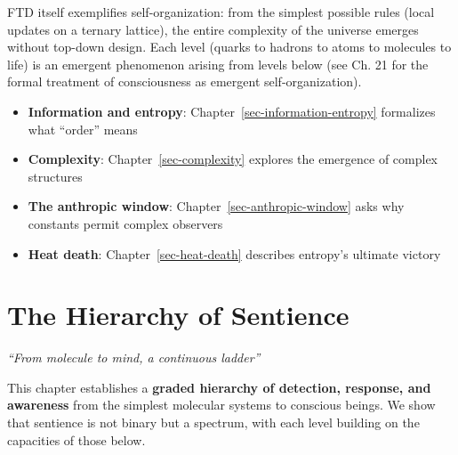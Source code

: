 \documentclass[
  11pt,
  letterpaper,
  twoside,
  openright]{book}
\providecommand{\tightlist}{%
  \setlength{\itemsep}{0pt}\setlength{\parskip}{0pt}}
\begin{document}
FTD itself exemplifies self-organization: from the simplest possible
rules (local updates on a ternary lattice), the entire complexity of the
universe emerges without top-down design. Each level (quarks to hadrons
to atoms to molecules to life) is an emergent phenomenon arising from
levels below (see Ch. 21 for the formal treatment of consciousness as
emergent self-organization).

\begin{tcolorbox}[enhanced jigsaw, leftrule=.75mm, title=\textcolor{quarto-callout-tip-color}{\faLightbulb}\hspace{0.5em}{Related Topics}, bottomrule=.15mm, opacityback=0, coltitle=black, arc=.35mm, colframe=quarto-callout-tip-color-frame, colbacktitle=quarto-callout-tip-color!10!white, colback=white, titlerule=0mm, breakable, bottomtitle=1mm, toptitle=1mm, rightrule=.15mm, toprule=.15mm, left=2mm, opacitybacktitle=0.6]

\begin{itemize}
\tightlist
\item
  \textbf{Information and entropy}:
  Chapter~\ref{sec-information-entropy} formalizes what ``order'' means
\item
  \textbf{Complexity}: Chapter~\ref{sec-complexity} explores the
  emergence of complex structures
\item
  \textbf{The anthropic window}: Chapter~\ref{sec-anthropic-window} asks
  why constants permit complex observers
\item
  \textbf{Heat death}: Chapter~\ref{sec-heat-death} describes entropy's
  ultimate victory
\end{itemize}

\end{tcolorbox}

\chapter{The Hierarchy of Sentience}\label{sec-hierarchy-sentience}

\emph{``From molecule to mind, a continuous ladder''}

\begin{tcolorbox}[enhanced jigsaw, leftrule=.75mm, title=\textcolor{quarto-callout-note-color}{\faInfo}\hspace{0.5em}{Purpose of This Chapter}, bottomrule=.15mm, opacityback=0, coltitle=black, arc=.35mm, colframe=quarto-callout-note-color-frame, colbacktitle=quarto-callout-note-color!10!white, colback=white, titlerule=0mm, breakable, bottomtitle=1mm, toptitle=1mm, rightrule=.15mm, toprule=.15mm, left=2mm, opacitybacktitle=0.6]

This chapter establishes a \textbf{graded hierarchy of detection,
response, and awareness} from the simplest molecular systems to
conscious beings. We show that sentience is not binary but a spectrum,
with each level building on the capacities of those below.

\end{tcolorbox}
\end{document}
